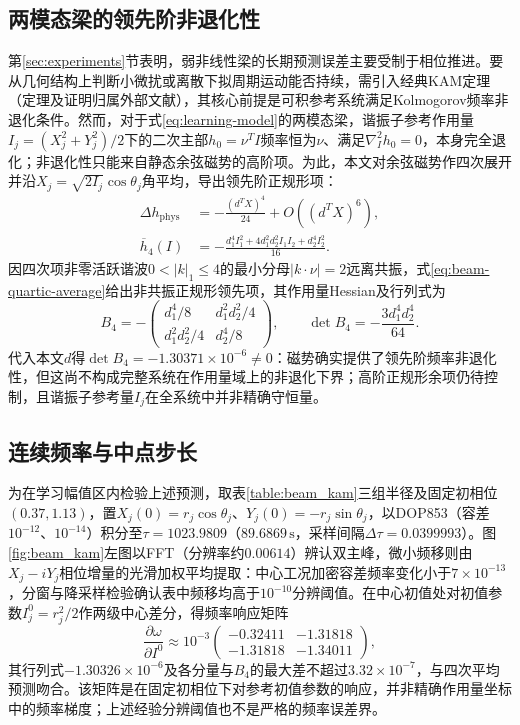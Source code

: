 \subsection{两模态梁的领先阶非退化性}

第\ref{sec:experiments}节表明，弱非线性梁的长期预测误差主要受制于相位推进。要从几何结构上判断小微扰或离散下拟周期运动能否持续，需引入经典KAM定理\citep[第1.e节，The Classical KAM Theorem]{Poschel2001}（定理及证明归属外部文献），其核心前提是可积参考系统满足Kolmogorov频率非退化条件。然而，对于式\eqref{eq:learning-model}的两模态梁，谐振子参考作用量$I_j=(X_j^2+Y_j^2)/2$下的二次主部$h_0=\nu^TI$频率恒为$\nu$、满足$\nabla_I^2h_0=0$，本身完全退化；非退化性只能来自静态余弦磁势的高阶项。为此，本文对余弦磁势作四次展开并沿$X_j=\sqrt{2I_j}\cos\theta_j$角平均，导出领先阶正规形项：
\begin{equation}
\begin{aligned}
\Delta h_{\mathrm{phys}}&=-\frac{(d^TX)^4}{24}+O((d^TX)^6),\\
\overline h_4(I)&=-\frac{d_1^4I_1^2+4d_1^2d_2^2I_1I_2+d_2^4I_2^2}{16}.
\end{aligned}
\label{eq:beam-quartic-average}
\end{equation}
因四次项非零活跃谐波$0<|k|_1\leq4$的最小分母$|k\cdot\nu|=2$远离共振，式\eqref{eq:beam-quartic-average}给出非共振正规形领先项，其作用量Hessian及行列式为
\begin{equation}
B_4=-\begin{pmatrix}
d_1^4/8&d_1^2d_2^2/4\\
d_1^2d_2^2/4&d_2^4/8
\end{pmatrix},\qquad
\det B_4=-\frac{3d_1^4d_2^4}{64}.
\label{eq:beam-leading-twist}
\end{equation}
代入本文$d$得$\det B_4=-1.30371\times10^{-6}\neq0$：磁势确实提供了领先阶频率非退化性，但这尚不构成完整系统在作用量域上的非退化下界；高阶正规形余项仍待控制，且谐振子参考量$I_j$在全系统中并非精确守恒量。

\subsection{连续频率与中点步长}

为在学习幅值区内检验上述预测，取表\ref{table:beam_kam}三组半径及固定初相位$(0.37,1.13)$，置$X_j(0)=r_j\cos\theta_j$、$Y_j(0)=-r_j\sin\theta_j$，以DOP853（容差$10^{-12}$、$10^{-14}$）积分至$\tau=1023.9809$（$89.6869\,\mathrm s$，采样间隔$\Delta\tau=0.0399993$）。图\ref{fig:beam_kam}左图以FFT（分辨率约$0.00614$）辨认双主峰，微小频移则由$X_j-iY_j$相位增量的光滑加权平均提取：中心工况加密容差频率变化小于$7\times10^{-13}$，分窗与降采样检验确认表中频移均高于$10^{-10}$分辨阈值。在中心初值处对初值参数$I_j^0=r_j^2/2$作两级中心差分，得频率响应矩阵
\[
\frac{\partial\omega}{\partial I^0}\approx10^{-3}
\begin{pmatrix}
-0.32411&-1.31818\\
-1.31818&-1.34011
\end{pmatrix},
\]
其行列式$-1.30326\times10^{-6}$及各分量与$B_4$的最大差不超过$3.32\times10^{-7}$，与四次平均预测吻合。该矩阵是在固定初相位下对参考初值参数的响应，并非精确作用量坐标中的频率梯度；上述经验分辨阈值也不是严格的频率误差界。

